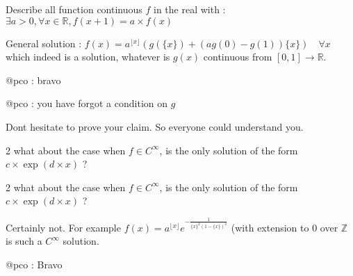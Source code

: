 \begin{solution}
	\begin{tcolorbox}Describe all function continuous $f$ in the real with : $\exists a>0, \forall x \in \mathbb R, f(x+1)=a \times f(x)$\end{tcolorbox}

General solution : $\boxed{f(x)=a^{\lfloor x\rfloor}(g(\{x\})+(ag(0)-g(1))\{x\})\quad\forall x}$ which indeed is a solution, whatever is $g(x)$ continuous from $[0,1]\to\mathbb R$.

\end{solution}



\begin{solution}
	@pco : bravo
\end{solution}



\begin{solution}
	\begin{tcolorbox}@pco : you have forgot a condition on $g$\end{tcolorbox}
Dont hesitate to prove your claim. So everyone could understand you.
\end{solution}



\begin{solution}
	2\/ what about the case when $f\in C^{\infty}$, is the only solution of the form $c\times \exp(d\times x)$ ?
\end{solution}



\begin{solution}
	\begin{tcolorbox}2\/ what about the case when $f\in C^{\infty}$, is the only solution of the form $c\times \exp(d\times x)$ ?\end{tcolorbox}

Certainly not.
For example $f(x)=a^{\lfloor x\rfloor}e^{-\frac 1{\{x\}^2(1-\{x\})^2}}$  (with extension to $0$ over $\mathbb Z$ is such a $C^{\infty}$ solution.
\end{solution}



\begin{solution}
	@pco : Bravo
\end{solution}



